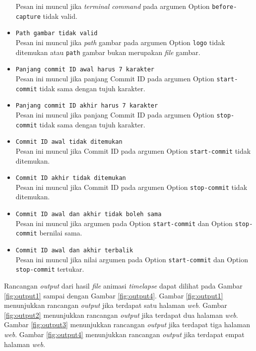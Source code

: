 \begin{itemize}
Pesan ini muncul jika \textit{terminal command} pada argumen Option \texttt{before-capture} tidak valid.
\item \texttt{Path gambar tidak valid}\\
Pesan ini muncul jika \textit{path} gambar pada argumen Option \texttt{logo} tidak ditemukan atau \texttt{path} gambar bukan merupakan \textit{file} gambar.
\item \texttt{Panjang commit ID awal harus 7 karakter}\\
Pesan ini muncul jika panjang Commit ID pada argumen Option \texttt{start-commit} tidak sama dengan tujuh karakter.
\item \texttt{Panjang commit ID akhir harus 7 karakter}\\
Pesan ini muncul jika panjang Commit ID pada argumen Option \texttt{stop-commit} tidak sama dengan tujuh karakter.
\item \texttt{Commit ID awal tidak ditemukan}\\
Pesan ini muncul jika Commit ID pada argumen Option \texttt{start-commit} tidak ditemukan.
\item \texttt{Commit ID akhir tidak ditemukan}\\
Pesan ini muncul jika Commit ID pada argumen Option \texttt{stop-commit} tidak ditemukan.
\item \texttt{Commit ID awal dan akhir tidak boleh sama}\\
Pesan ini muncul jika argumen pada Option \texttt{start-commit} dan Option \texttt{stop-commit} bernilai sama.
\item \texttt{Commit ID awal dan akhir terbalik}\\
Pesan ini muncul jika nilai argumen pada Option \texttt{start-commit} dan Option \texttt{stop-commit} tertukar.

\end{itemize}

Rancangan \textit{output} dari hasil \textit{file} animasi \textit{timelapse} dapat dilihat pada Gambar \ref{fig:output1} sampai dengan Gambar \ref{fig:output4}. Gambar \ref{fig:output1} menunjukkan rancangan \textit{output} jika terdapat satu halaman \textit{web}. Gambar \ref{fig:output2} menunjukkan rancangan \textit{output} jika terdapat dua halaman \textit{web}. Gambar \ref{fig:output3} menunjukkan rancangan \textit{output} jika terdapat tiga halaman \textit{web}. Gambar \ref{fig:output4} menunjukkan rancangan \textit{output} jika terdapat empat halaman \textit{web}. 

